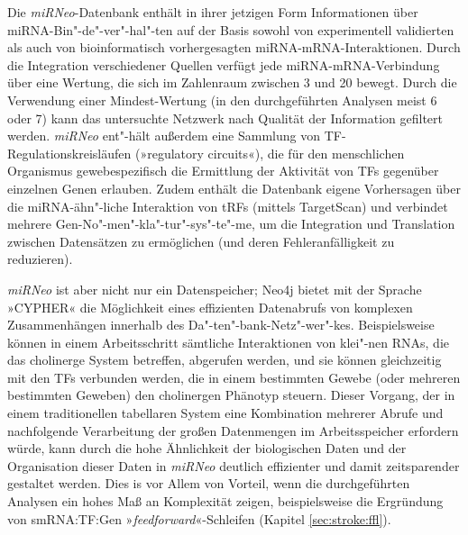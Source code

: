 Die \emph{miRNeo}-Datenbank enthält in ihrer jetzigen Form Informationen über miRNA-Bin"-de"-ver"-hal"-ten auf der Basis sowohl von experimentell validierten als auch von bioinformatisch vorhergesagten miRNA-mRNA-Interaktionen. Durch die Integration verschiedener Quellen verfügt jede miRNA-mRNA-Verbindung über eine Wertung, die sich im Zahlenraum zwischen 3 und 20 bewegt. Durch die Verwendung einer Mindest-Wertung (in den durchgeführten Analysen meist 6 oder 7) kann das untersuchte Netzwerk nach Qualität der Information gefiltert werden. \emph{miRNeo} ent"-hält außerdem eine Sammlung von TF-Regulationskreisläufen (»regulatory circuits«), die für den menschlichen Organismus gewebespezifisch die Ermittlung der Aktivität von TFs gegenüber einzelnen Genen erlauben.\cite{Marbach2016} Zudem enthält die Datenbank eigene Vorhersagen über die miRNA-ähn"-liche Interaktion von tRFs (mittels TargetScan) und verbindet mehrere Gen-No"-men"-kla"-tur"-sys"-te"-me, um die Integration und Translation zwischen Datensätzen zu ermöglichen (und deren Fehleranfälligkeit zu reduzieren).

\emph{miRNeo} ist aber nicht nur ein Datenspeicher; Neo4j bietet mit der Sprache »CYPHER« die Möglichkeit eines effizienten Datenabrufs von komplexen Zusammenhängen innerhalb des Da"-ten"-bank-Netz"-wer"-kes. Beispielsweise können in einem Arbeitsschritt sämtliche Interaktionen von klei"-nen RNAs, die das cholinerge System betreffen, abgerufen werden, und sie können gleichzeitig mit den TFs verbunden werden, die in einem bestimmten Gewebe (oder mehreren bestimmten Geweben) den cholinergen Phänotyp steuern. Dieser Vorgang, der in einem traditionellen tabellaren System eine Kombination mehrerer Abrufe und nachfolgende Verarbeitung der großen Datenmengen im Arbeitsspeicher erfordern würde, kann durch die hohe Ähnlichkeit der biologischen Daten und der Organisation dieser Daten in \emph{miRNeo} deutlich effizienter und damit zeitsparender gestaltet werden. Dies is vor Allem von Vorteil, wenn die durchgeführten Analysen ein hohes Maß an Komplexität zeigen, beispielsweise die Ergründung von smRNA:TF:Gen »\emph{feedforward}«-Schleifen (Kapitel \ref{sec:stroke:ffl}).

